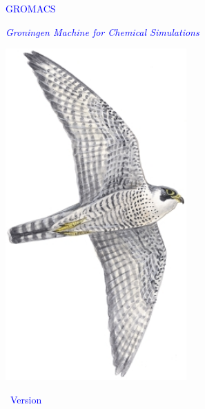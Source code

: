 \documentclass[11pt,a4paper,twoside]{gmxmanual}
\newcommand{\gmxlite}{0}
\begin{document}

\addtolength{\oddsidemargin}{-5mm}

%
%
\pagestyle{empty}
\begin{center}

\textcolor{blue}{\fontsize{84}{96} \selectfont GROMACS}
\vspace{4mm}

\textcolor{blue}{\LARGE \em Groningen Machine for Chemical Simulations}
\vspace{4mm}

\includegraphics[height=5in]{plots/peregrine}
\vspace{4mm}

\ifthenelse{\equal{\gmxlite}{1}}
{
}
{
} %
\vspace{4mm}

\textcolor{blue}{\fontsize{48}{56} \selectfont ~Version \gmxver~}



\end{center}
\vfill
\end{document}
